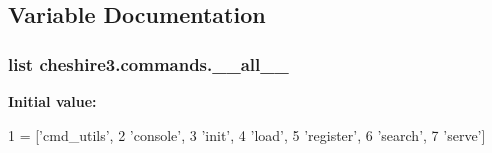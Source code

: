 \subsection{Variable Documentation}
\hypertarget{namespacecheshire3_1_1commands_a1fef5c730d192c0f550a6edefa34522e}{
\subsubsection[{\-\_\-\-\_\-all\-\_\-\-\_\-}]{\setlength{\rightskip}{0pt plus 5cm}list cheshire3.\-commands.\-\_\-\-\_\-all\-\_\-\-\_\-}}\label{namespacecheshire3_1_1commands_a1fef5c730d192c0f550a6edefa34522e}
{\bfseries Initial value\-:}
\begin{DoxyCode}
1 = [\textcolor{stringliteral}{'cmd\_utils'},
2            \textcolor{stringliteral}{'console'},
3            \textcolor{stringliteral}{'init'},
4            \textcolor{stringliteral}{'load'},
5            \textcolor{stringliteral}{'register'},
6            \textcolor{stringliteral}{'search'},
7            \textcolor{stringliteral}{'serve'}]
\end{DoxyCode}
